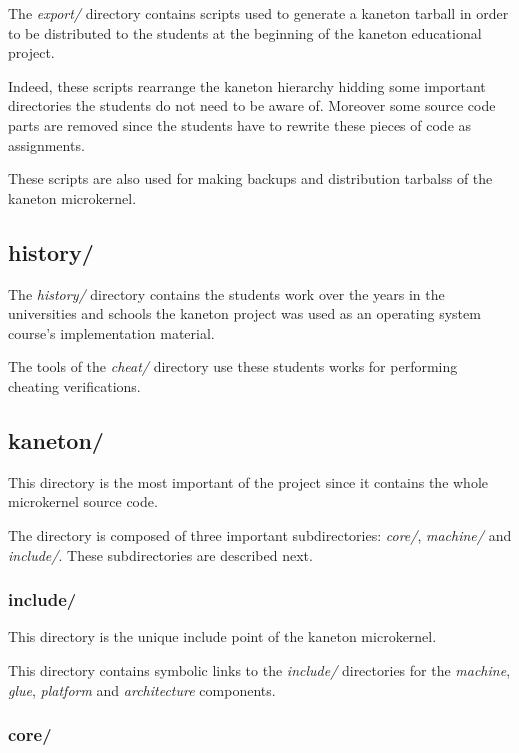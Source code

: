 The \textit{export/} directory contains scripts used to generate a kaneton
tarball in order to be distributed to the students at the beginning of the
kaneton educational project.

Indeed, these scripts rearrange the kaneton hierarchy hidding some important
directories the students do not need to be aware of. Moreover some source
code parts are removed since the students have to rewrite these pieces
of code as assignments.

These scripts are also used for making backups and distribution tarbalss of
the kaneton microkernel.

%
%

\subsection*{history/}

The \textit{history/} directory contains the students work over the years
in the universities and schools the kaneton project was used as an operating
system course's implementation material.

The tools of the \textit{cheat/} directory use these students works for
performing cheating verifications.

%
%

\subsection*{kaneton/}

This directory is the most important of the project since it contains
the whole microkernel source code.

The directory is composed of three important subdirectories: \textit{core/},
\textit{machine/} and \textit{include/}. These subdirectories are described
next.


\subsubsection*{include/}

This directory is the unique include point of the kaneton microkernel.

This directory contains symbolic links to the \textit{include/} directories
for the \textit{machine}, \textit{glue}, \textit{platform} and
\textit{architecture} components.


\subsubsection*{core/}

